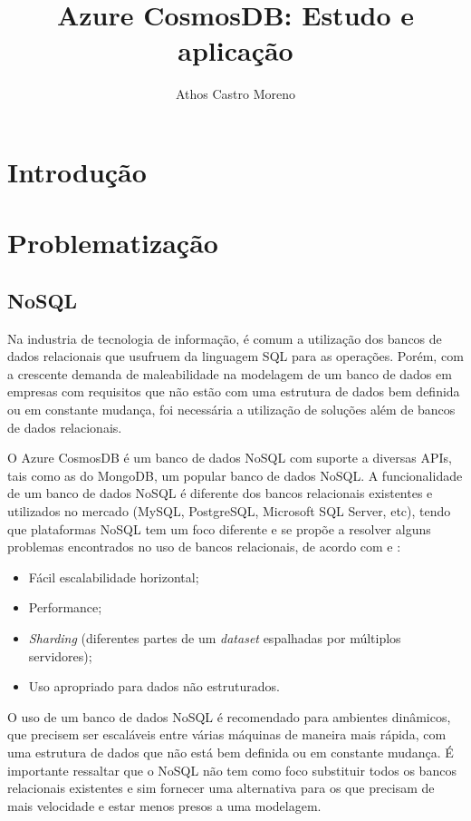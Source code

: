 \documentclass[12pt]{article}
\title{Azure CosmosDB: Estudo e aplicação}
\author{Athos Castro Moreno}
\begin{document}
 

\maketitle

\begin{resumo} 
\end{resumo}

\section{Introdução}

\section{Problematização} 

\subsection{NoSQL}
Na industria de tecnologia de informação, é comum a utilização dos bancos de dados relacionais que usufruem da linguagem SQL para as operações. Porém, com a crescente demanda
de maleabilidade na modelagem de um banco de dados em empresas com requisitos que não estão com uma estrutura de dados bem definida ou em constante mudança, foi necessária a 
utilização de soluções além de bancos de dados relacionais.

O Azure CosmosDB é um banco de dados NoSQL com suporte a diversas APIs, tais como as do MongoDB, um popular banco de dados NoSQL. A funcionalidade de um banco de dados 
NoSQL é diferente dos bancos relacionais existentes e utilizados no mercado (MySQL, PostgreSQL, Microsoft SQL Server, etc), tendo que plataformas 
NoSQL tem um foco diferente e se propõe a resolver alguns problemas encontrados no uso de bancos relacionais, de acordo com \cite{Membrey2011} e \cite{Oliveira2011}:
\begin{itemize}
	\item Fácil escalabilidade horizontal;
	\item Performance;
	\item \textit{Sharding} (diferentes partes de um \textit{dataset} espalhadas por múltiplos servidores);
	\item Uso apropriado para dados não estruturados.
\end{itemize}

O uso de um banco de dados NoSQL é recomendado para ambientes dinâmicos, que precisem ser escaláveis entre várias máquinas de maneira mais rápida, com uma estrutura de dados que não está bem 
definida ou em constante mudança. É importante ressaltar que o NoSQL não tem como foco substituir todos os bancos relacionais existentes e sim fornecer uma alternativa para os que 
precisam de mais velocidade e estar menos presos a uma modelagem. 
\end{document}
